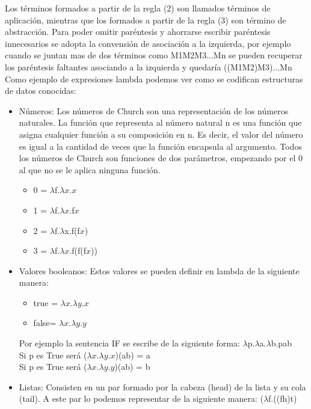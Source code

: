 Los términos formados a partir de la regla (2) son llamados términos de aplicación, mientras que los formados a partir de la regla (3) son término de abstracción.
Para poder omitir paréntesis y ahorrarse escribir paréntesis innecesarios se adopta la convensión de asociación a la izquierda, por ejemplo cuando se juntan mas de dos términos como M1M2M3...Mn se pueden recuperar los paréntesis faltantes asociando a la izquierda y quedaría ((M1M2)M3)...Mn
\\
Como ejemplo de expresiones lambda podemos ver como se codifican estructuras de datos conocidas:
\begin{itemize}
\item Números: Los números de Church son una representación de los números naturales. La función que representa al número natural n es una función que asigna cualquier función a su composición en n. Es decir, el valor del número es igual a la cantidad de veces que la función encapsula al argumento. Todos los números de Church son funciones de dos parámetros, empezando por el 0 al que no se le aplica ninguna función.
  \begin{itemize}
    \item 0 = $\lambda$f.$\lambda$$x$.$x$
    \item 1 = $\lambda$f.$\lambda$$x$.f$x$
    \item 2 = $\lambda$f.$\lambda$x.f(f$x$)
    \item 3 = $\lambda$f.$\lambda$$x$.f(f(f$x$))
  \end{itemize}
\item Valores booleanos: Estos valores se pueden definir en lambda de la siguiente manera:
  \begin{itemize}
    \item true = $\lambda$$x$.$\lambda$$y$.$x$
    \item false= $\lambda$$x$.$\lambda$$y$.$y$
    \end{itemize}
    Por ejemplo la sentencia IF se escribe de la siguiente forma: $\lambda$p.$\lambda$a.$\lambda$b.pab \\
    Si p es True será ($\lambda$$x$.$\lambda$$y$.$x$)(ab) = a \\
    Si p es True será ($\lambda$$x$.$\lambda$$y$.$y$)(ab) = b
  \item Listas: Consisten en un par formado por la cabeza (head) de la lista y su cola (tail). A este par lo podemos representar de la siguiente manera: ($\lambda$f.((fh)t)
\end{itemize}


